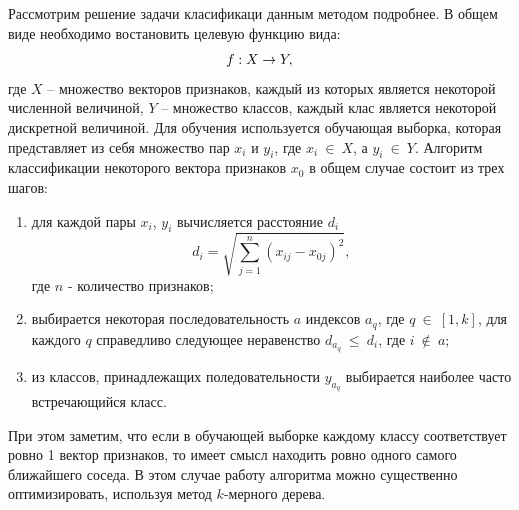 \documentclass[14pt, a4paper]{extreport}
\begin{document}
	Рассмотрим решение задачи класификаци данным методом подробнее. В общем виде необходимо востановить целевую функцию вида:
	\vspace*{-0.5cm}
	\begin{equation*}
		f: X \rightarrow Y, 
		\label{KNNf}
		\vspace*{-0.5cm}
	\end{equation*}
	где $X$ -- множество векторов признаков, каждый из которых является некоторой численной величиной, $Y$ -- множество классов, каждый клас является некоторой дискретной величиной. Для обучения используется обучающая выборка, которая представляет из себя множество пар $x_i$ и $y_i$, где $x_i~\in~X$, а $y_i~\in~Y$.
	Алгоритм классификации некоторого вектора признаков $x_0$ в общем случае состоит из трех шагов:
	\begin{enumerate}[label={\arabic*)}]
		\item для каждой пары $x_i$, $y_i$ вычисляется расстояние $d_i$
		\begin{equation*}
			d_i = \sqrt{\sum\limits_{j=1}^n (x_{ij} - x_{0j})^2}, 
			\label{disqrt}
		\end{equation*}
		где $n$ - количество признаков;
		\item выбирается некоторая последовательность $a$ индексов $a_q$, где \linebreak $q~\in~[1, k]$, для каждого $q$ справедливо следующее неравенство $d_{a_q}~\le~d_{i}$, где $i~\notin~a$;
		\item из классов, принадлежащих поледовательности $y_{a_q}$ выбирается наиболее часто встречающийся класс.
	\end{enumerate}

	При этом заметим, что если в обучающей выборке каждому классу соответствует ровно 1 вектор признаков, то имеет смысл находить ровно одного самого ближайшего соседа.
	В этом случае работу алгоритма можно существенно оптимизировать, используя метод $k$-мерного дерева.
	
\end{document}

